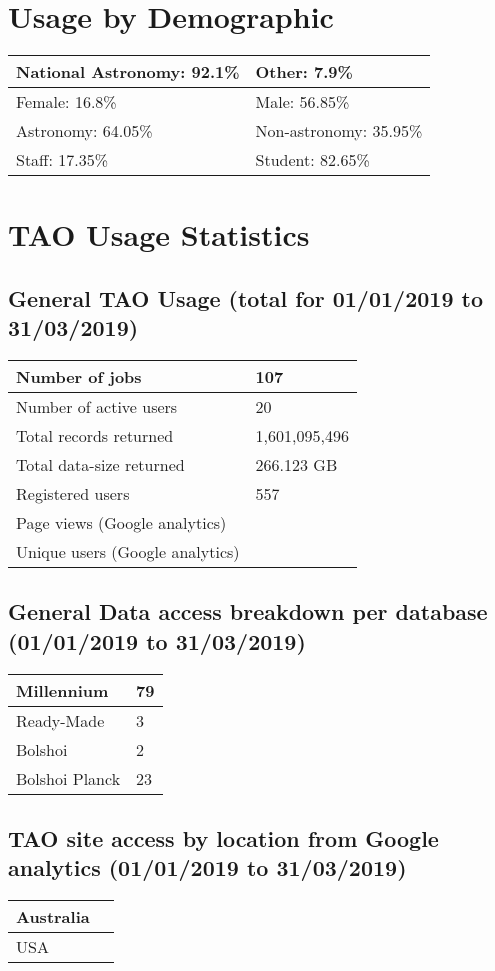 \documentclass{article}%
\begin{document}
\section{Usage by Demographic}%

%
\begin{longtabu}{X[l] X[l]}%
National Astronomy:  92.1\%&Other:  7.9\%\\%
\hline%
Female:  16.8\%&Male:  56.85\%\\%
\hline%
Astronomy:  64.05\%&Non{-}astronomy:  35.95\%\\%
\hline%
Staff:  17.35\%&Student:  82.65\%\\%
\hline%
\end{longtabu}%
\newpage%
\section{TAO Usage Statistics}%

%
\subsection{General TAO Usage (total for 01/01/2019 to 31/03/2019)}%

%
\begin{longtabu}{X[l] X[l]}%
Number of jobs&107\\%
\hline%
Number of active users&20\\%
\hline%
Total records returned&1,601,095,496\\%
\hline%
Total data{-}size returned&266.123 GB\\%
\hline%
Registered users&557\\%
\hline%
Page views (Google analytics)&\\%
\hline%
Unique users (Google analytics)&\\%
\hline%
\end{longtabu}%
\subsection{General Data access breakdown per database (01/01/2019 to 31/03/2019)}%

%
\begin{longtabu}{X[l] X[l]}%
Millennium&79\\%
\hline%
Ready{-}Made&3\\%
\hline%
Bolshoi&2\\%
\hline%
Bolshoi Planck&23\\%
\hline%
\end{longtabu}%
\subsection{TAO site access by location from Google analytics (01/01/2019 to 31/03/2019)}%

%
\begin{longtabu}{X[l] X[l]}%
Australia&\\%
\hline%
USA&\\%
\hline%
\end{longtabu}%
\end{document}
